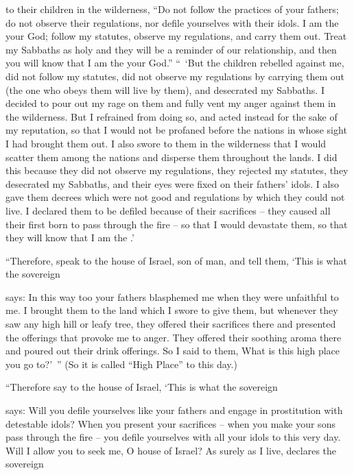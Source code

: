 {to
their children
in the wilderness,
“Do not
follow
the practices
of your fathers;
do
not
observe
their regulations,
nor defile
yourselves with their idols.
I am
the {}
your God;
follow
my statutes,
observe
my regulations,
and carry
them out.
Treat my Sabbaths
as holy
and they will be
a reminder
of our relationship,
and then you will know
that
I am
the {}
your God.”
“ ‘But the children
rebelled
against me, did not
follow
my statutes,
did not
observe
my regulations
by carrying
them out
(the one
who
obeys
them will live
by them), and desecrated
my Sabbaths.
I decided
to pour out
my rage
on
them and fully vent
my anger
against them in the wilderness.
But I refrained from
doing
so, and acted
instead for the sake
of my reputation,
so that I would not
be profaned
before
the nations
in whose
sight
I had brought them out.
I
also
swore
to them in the wilderness
that I would scatter
them among the nations
and disperse
them throughout the lands.
I did this because
they did not
observe
my regulations,
they rejected
my statutes,
they desecrated
my Sabbaths,
and their eyes
were fixed
on their fathers’
idols.
I
also
gave
them decrees
which were not
good
and regulations
by which they could not
live.
I declared them to be defiled
because of their sacrifices –
they caused
all
their first born
to pass through the fire – so that I would devastate them, so that they will know that I am the
{}.’
\par }{\PP {}“Therefore,
speak
to
the house
of Israel,
son
of man,
and tell
them, ‘This is what
the sovereign

{}
says: In this
way too
your fathers
blasphemed
me when they were unfaithful to me.
I brought
them to
the land
which
I swore
to give
them, but whenever they saw
any
high
hill
or leafy
tree,
they offered their sacrifices there
and presented
the
offerings that provoke
me to
anger. They
offered their soothing
aroma
there
and poured
out their drink offerings.
So I said
to
them, What
is this high place
you
go to?’ ” (So
it is called
“High Place”
to
this
day.)
\par }{\PP {}“Therefore
say
to
the house
of Israel,
‘This is what
the sovereign

{}
says: Will you
defile
yourselves
like your fathers
and engage in prostitution
with detestable idols?
When you present
your sacrifices –
when you make your sons
pass
through the fire
– you
defile
yourselves with all
your idols
to
this very
day.
Will I
allow you to seek
me, O house
of Israel? As surely
as I
live, declares
the sovereign

}
